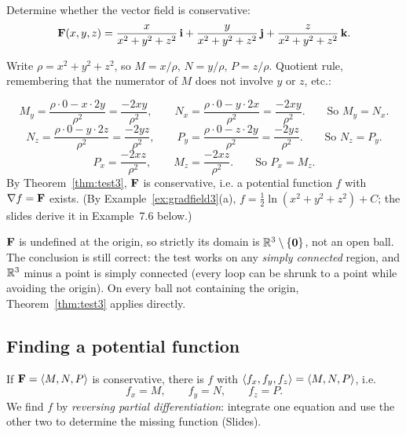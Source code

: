 \begin{example}\label{ex:7.5}
Determine whether the vector field is conservative:
\[
  \mathbf{F}(x,y,z)=\frac{x}{x^2+y^2+z^2}\,\mathbf{i}+\frac{y}{x^2+y^2+z^2}\,\mathbf{j}+\frac{z}{x^2+y^2+z^2}\,\mathbf{k} .
\]
\end{example}
\begin{solution}
Write $\rho=x^2+y^2+z^2$, so $M=x/\rho$, $N=y/\rho$, $P=z/\rho$. Quotient rule,
remembering that the numerator of $M$ does not involve $y$ or $z$, etc.:

\[
  M_y=\frac{\rho\cdot0-x\cdot2y}{\rho^2}=\frac{-2xy}{\rho^2},\qquad
  N_x=\frac{\rho\cdot0-y\cdot2x}{\rho^2}=\frac{-2xy}{\rho^2}.\qquad\text{So }M_y=N_x.
\]
\[
  N_z=\frac{\rho\cdot0-y\cdot2z}{\rho^2}=\frac{-2yz}{\rho^2},\qquad
  P_y=\frac{\rho\cdot0-z\cdot2y}{\rho^2}=\frac{-2yz}{\rho^2}.\qquad\text{So }N_z=P_y.
\]
\[
  P_x=\frac{-2xz}{\rho^2},\qquad M_z=\frac{-2xz}{\rho^2}.\qquad\text{So }P_x=M_z.
\]
By Theorem~\ref{thm:test3}, $\mathbf{F}$ is conservative, i.e. a potential function
$f$ with $\nabla f=\mathbf{F}$ exists. (By Example~\ref{ex:gradfield3}(a),
$f=\frac12\ln(x^2+y^2+z^2)+C$; the slides derive it in Example~7.6 below.)
\end{solution}

\begin{remark}
$\mathbf{F}$ is undefined at the origin, so strictly its domain is
$\mathbb{R}^3\setminus\{\mathbf{0}\}$, not an open ball. The conclusion is still correct:
the test works on any \emph{simply connected} region, and $\mathbb{R}^3$ minus a point is
simply connected (every loop can be shrunk to a point while avoiding the
origin). On every ball not containing the origin, Theorem~\ref{thm:test3}
applies directly.
\end{remark}

\subsection{Finding a potential function}\label{sec:potential}

If $\mathbf{F}=\left\langle M,N,P \right\rangle$ is conservative, there is $f$ with
$\left\langle f_x,f_y,f_z \right\rangle=\left\langle M,N,P \right\rangle$, i.e.
\[
  f_x=M,\qquad f_y=N,\qquad f_z=P .
\]
We find $f$ by \emph{reversing partial differentiation}: integrate one equation
and use the other two to determine the missing function (Slides).

